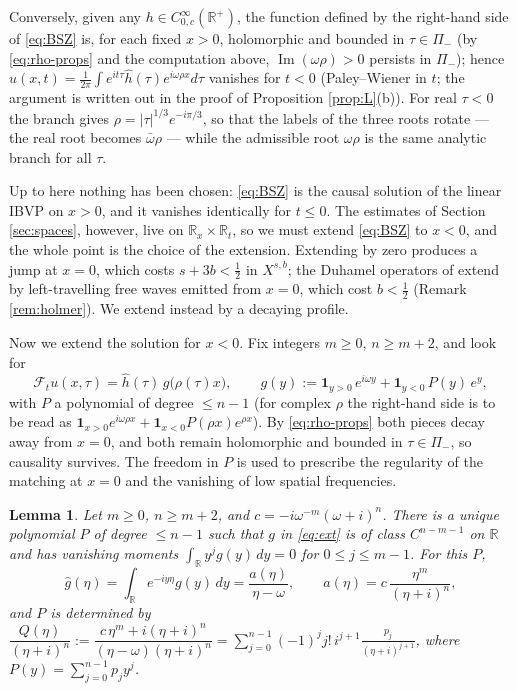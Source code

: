 \documentclass[10pt,reqno]{amsart}
\newtheorem{lemma}[theorem]{Lemma}
\theoremstyle{remark}
\numberwithin{equation}{section}
\newcommand{\R}{\mathbb R}
\newcommand{\om}{\omega}
\newcommand{\ima}{\operatorname{Im}}
\newcommand{\F}{\mathcal{F}}
\begin{document}
 Conversely, given any $h\in C^\infty_{0,c}(\R^+)$, the function defined by the right-hand side of \eqref{eq:BSZ} is, for each fixed $x>0$, holomorphic and bounded in $\tau\in\Pi_-$ (by \eqref{eq:rho-props} and the computation above, $\ima(\om\rho)>0$ persists in $\Pi_-$); hence $u(x,t)=\frac1{2\pi}\int e^{it\tau}\widehat h(\tau)e^{i\om\rho x}d\tau$ vanishes for $t<0$ (Paley--Wiener in $t$; the argument is written out in the proof of Proposition \ref{prop:L}(b)). For real $\tau<0$ the branch gives $\rho=|\tau|^{1/3}e^{-i\pi/3}$, so that the labels of the three roots rotate --- the real root becomes $\bar\om\rho$ --- while the admissible root $\om\rho$ is the same analytic branch for all $\tau$.

Up to here nothing has been chosen: \eqref{eq:BSZ} is the causal solution of the linear IBVP on $x>0$, and it vanishes identically for $t\le0$. The estimates of Section \ref{sec:spaces}, however, live on $\R_x\times\R_t$, so we must extend \eqref{eq:BSZ} to $x<0$, and the whole point is the choice of the extension. Extending by zero produces a jump at $x=0$, which costs $s+3b<\frac12$ in $X^{s,b}$; the Duhamel operators of \cite{CK,Holmer} extend by left-travelling free waves emitted from $x=0$, which cost $b<\frac12$ (Remark \ref{rem:holmer}). We extend instead by a decaying profile.

Now we extend the solution for $x<0$. Fix integers $m\ge0$, $n\ge m+2$, and look for
\begin{equation}\label{eq:ext}
\F_tu(x,\tau)=\widehat h(\tau)\,g\big(\rho(\tau)x\big),\qquad g(y):=\mathbf 1_{y>0}\,e^{i\om y}+\mathbf 1_{y<0}\,P(y)\,e^{y},
\end{equation}
with $P$ a polynomial of degree $\le n-1$ (for complex $\rho$ the right-hand side is to be read as $\mathbf 1_{x>0}e^{i\om\rho x}+\mathbf 1_{x<0}P(\rho x)e^{\rho x}$). By \eqref{eq:rho-props} both pieces decay away from $x=0$, and both remain holomorphic and bounded in $\tau\in\Pi_-$, so causality survives. The freedom in $P$ is used to prescribe the regularity of the matching at $x=0$ and the vanishing of low spatial frequencies.

\begin{lemma}\label{lem:glue}
Let $m\ge0$, $n\ge m+2$, and $c=-i\om^{-m}(\om+i)^n$. There is a unique polynomial $P$ of degree $\le n-1$ such that $g$ in \eqref{eq:ext} is of class $C^{n-m-1}$ on $\R$ and has vanishing moments $\int_\R y^jg(y)\,dy=0$ for $0\le j\le m-1$. For this $P$,
\begin{equation}\label{eq:ghat}
\widehat g(\eta)=\int_\R e^{-iy\eta}g(y)\,dy=\frac{a(\eta)}{\eta-\om},\qquad a(\eta)=c\,\frac{\eta^m}{(\eta+i)^n},
\end{equation}
and $P$ is determined by $\dfrac{Q(\eta)}{(\eta+i)^n}:=\dfrac{c\,\eta^m+i(\eta+i)^n}{(\eta-\om)(\eta+i)^n}=\displaystyle\sum_{j=0}^{n-1}(-1)^jj!\,i^{j+1}\frac{p_j}{(\eta+i)^{j+1}}$, where $P(y)=\sum_{j=0}^{n-1}p_jy^j$.
\end{lemma}
\end{document}
